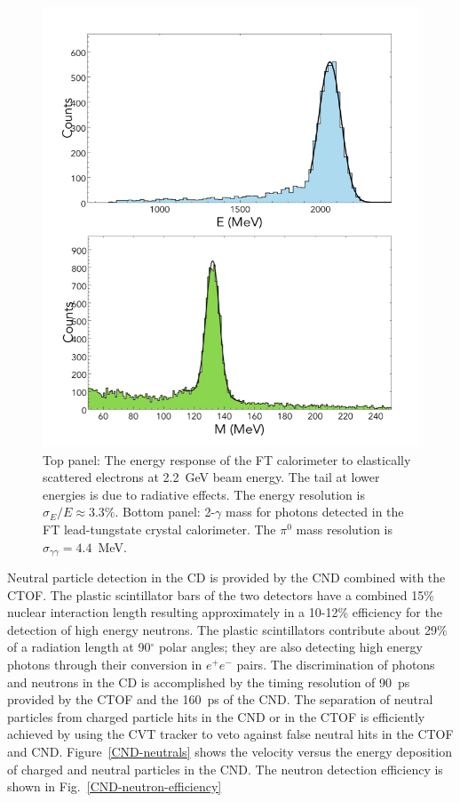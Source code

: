 \documentclass[final,3p,twocolumn]{elsarticle}
\begin{document}
\begin{figure}[tp!]
\centerline{\includegraphics[width=1.15\columnwidth]{FT-performance.png}}
\caption{Top panel: The energy response of the FT calorimeter to elastically scattered electrons at 2.2~GeV
  beam energy. The tail at lower energies is due to radiative effects. The energy resolution is
  $\sigma_E / E \approx 3.3\%$. Bottom panel: 2-$\gamma$ mass for photons detected in the FT lead-tungstate
  crystal calorimeter. The $\pi^0$ mass resolution is $\sigma_{\gamma\gamma} = 4.4$~MeV.}
\label{FT-en-gg}
\end{figure}

Neutral particle detection in the CD is provided by the CND combined with the CTOF. The plastic scintillator bars
of the two detectors have a combined 15\% nuclear interaction length resulting approximately in a 10-12\% efficiency
for the detection of high energy neutrons. The plastic scintillators contribute about 29\% of a radiation length at
90$^\circ$ polar angles; they are also detecting high energy photons through their conversion in $e^+e^-$ pairs. The
discrimination of photons and neutrons in the CD is  accomplished by the timing resolution of 90~ps provided by the
CTOF and the 160~ps of the CND. The separation of neutral particles from charged particle hits in the CND or in
the CTOF is efficiently achieved by using the CVT tracker to veto against false neutral hits in the CTOF and CND.
Figure~\ref{CND-neutrals} shows the velocity versus the energy deposition of charged and neutral particles in the
CND. The neutron detection efficiency is shown in Fig.~\ref{CND-neutron-efficiency} 
\end{document}

